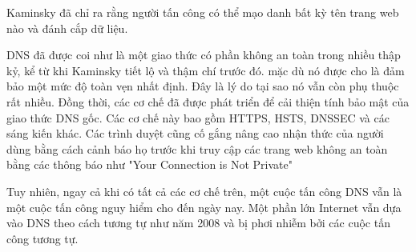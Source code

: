 \documentclass{article}
\begin{document}
Kaminsky đã chỉ ra rằng người tấn công có thể mạo danh bất kỳ tên trang web nào và đánh cắp dữ liệu.

DNS đã được coi như là một giao thức có phần không an toàn trong nhiều thập kỷ, kể từ khi Kaminsky tiết lộ và thậm chí trước đó. mặc dù nó được cho là đảm bảo một mức độ toàn vẹn nhất định. Đây là lý do tại sao nó vẫn còn phụ thuộc rất nhiều. Đồng thời, các cơ chế đã được phát triển để cải thiện tính bảo mật của giao thức DNS gốc. Các cơ chế này bao gồm HTTPS, HSTS, DNSSEC và các sáng kiến khác. Các trình duyệt cũng cố gắng nâng cao nhận thức của người dùng bằng cách cảnh báo họ trước khi truy cập các trang web không an toàn bằng các thông báo như "Your Connection is Not Private"

Tuy nhiên, ngay cả khi có tất cả các cơ chế trên, một cuộc tấn công DNS vẫn là một cuộc tấn công nguy hiểm cho đến ngày nay. Một phần lớn Internet vẫn dựa vào DNS theo cách tương tự như năm 2008 và bị phơi nhiễm bởi các cuộc tấn công tương tự.
\end{document}
